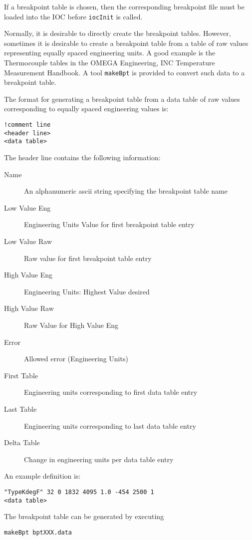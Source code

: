 If a breakpoint table is chosen, then the corresponding breakpoint file must be loaded into the IOC before \verb|iocInit| is called.

Normally, it is desirable to directly create the breakpoint tables.
However, sometimes it is desirable to create a breakpoint table from a table of raw values representing equally spaced engineering units.
A good example is the Thermocouple tables in the OMEGA Engineering, INC Temperature Measurement Handbook.
A tool \verb|makeBpt| is provided to convert such data to a breakpoint table.

The format for generating a breakpoint table from a data table of raw values corresponding to equally spaced engineering values is:

\begin{verbatim}
!comment line
<header line>
<data table>
\end{verbatim}

The header line contains the following information:

\begin{description}
\item [Name] An alphanumeric ascii string specifying the breakpoint table name
\item [Low Value Eng] Engineering Units Value for first breakpoint table entry
\item [Low Value Raw] Raw value for first breakpoint table entry
\item [High Value Eng] Engineering Units: Highest Value desired
\item [High Value Raw] Raw Value for High Value Eng
\item [Error] Allowed error (Engineering Units)
\item [First Table] Engineering units corresponding to first data table entry
\item [Last Table] Engineering units corresponding to last data table entry
\item [Delta Table] Change in engineering units per data table entry
\end{description}

 An example definition is:

\begin{verbatim}
"TypeKdegF" 32 0 1832 4095 1.0 -454 2500 1
<data table>
\end{verbatim}

The breakpoint table can be generated by executing

\begin{verbatim}
makeBpt bptXXX.data
\end{verbatim}

